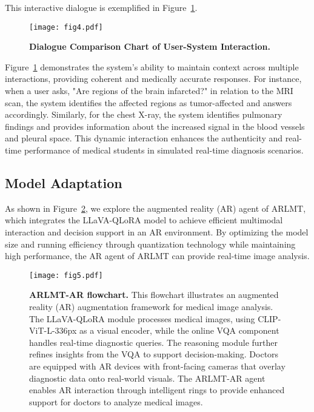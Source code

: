 \documentclass[10pt,letterpaper]{article}
\begin{document}
This interactive dialogue is exemplified in Figure~\ref{fig:dialogue}.

\begin{figure}[!h]
\centering
\texttt{[image: fig4.pdf]}
\caption{\bf Dialogue Comparison Chart of User-System Interaction.}
\label{fig:dialogue}
\end{figure}

Figure~\ref{fig:dialogue} demonstrates the system’s ability to maintain context across multiple interactions, providing coherent and medically accurate responses. For instance, when a user asks, "Are regions of the brain infarcted?" in relation to the MRI scan, the system identifies the affected regions as tumor-affected and answers accordingly. Similarly, for the chest X-ray, the system identifies pulmonary findings and provides information about the increased signal in the blood vessels and pleural space. This dynamic interaction enhances the authenticity and real-time performance of medical students in simulated real-time diagnosis scenarios.

\subsection*{Model Adaptation}

As shown in Figure~\ref{fig:5}, we explore the augmented reality (AR) agent of ARLMT, which integrates the LLaVA-QLoRA model to achieve efficient multimodal interaction and decision support in an AR environment. By optimizing the model size and running efficiency through quantization technology while maintaining high performance, the AR agent of ARLMT can provide real-time image analysis.

\begin{figure}[!h]
\centering
\texttt{[image: fig5.pdf]}
\caption{{\bf ARLMT-AR flowchart.}
This flowchart illustrates an augmented reality (AR) augmentation framework for medical image analysis. The LLaVA-QLoRA module processes medical images, using CLIP-ViT-L-336px as a visual encoder, while the online VQA component handles real-time diagnostic queries. The reasoning module further refines insights from the VQA to support decision-making. Doctors are equipped with AR devices with front-facing cameras that overlay diagnostic data onto real-world visuals. The ARLMT-AR agent enables AR interaction through intelligent rings to provide enhanced support for doctors to analyze medical images.}
\label{fig:5}
\end{figure}
\end{document}

